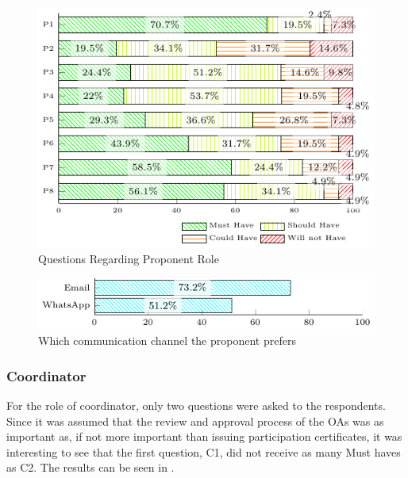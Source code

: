 \begin{figure}[!htb]
  \caption{Questions Regarding Proponent Role}\label{fig:proponent-questions}
  \begin{center}
    \includegraphics[width=13cm]{img/5-questions-proponent.pdf}
  \end{center}
\end{figure}

\begin{figure}[!htb]
  \caption{Which communication channel the proponent prefers}\label{fig:p7-question}
  \begin{center}
    \includegraphics[width=.8\textwidth]{img/5-questions-proponent-P7-1.pdf}
  \end{center}
\end{figure}

\subsubsection{Coordinator} \label{sec:survey-quant-coordinator}

For the role of coordinator, only two questions were asked to the respondents. Since it was assumed that the review and approval process of the \acp{OA} was as important as, if not more important than issuing participation certificates, it was interesting to see that the first question, C1, did not receive as many Must haves as C2. The results can be seen in .

